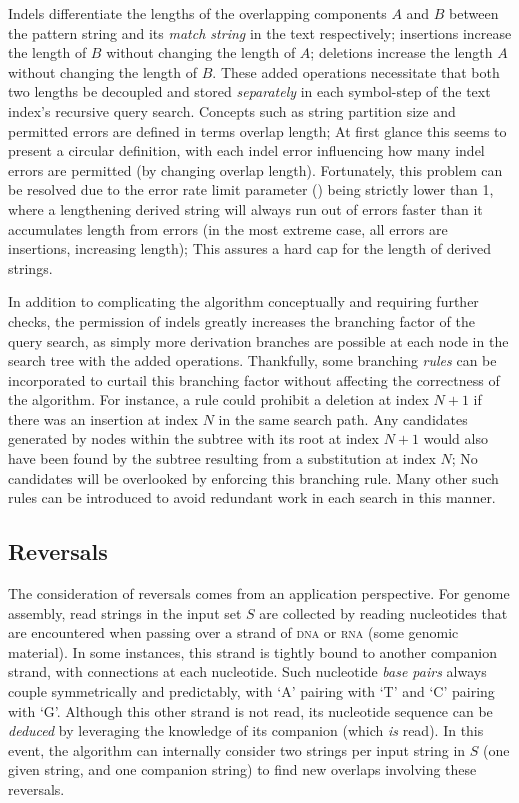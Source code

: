 Indels differentiate the lengths of the overlapping components $A$ and $B$ between the \gls{pattern} string and its \textit{match string} in the \gls{text} respectively; \Glspl{insertion} increase the length of $B$ without changing the length of $A$; \Glspl{deletion} increase the length $A$ without changing the length of $B$. These added operations necessitate that both two lengths be decoupled and stored \textit{separately} in each symbol-step of the \gls{text index}'s recursive \gls{query} search. Concepts such as \gls{string partition} size and permitted errors are defined in terms overlap length; At first glance this seems to present a circular definition, with each indel error influencing how many indel errors are permitted (by changing overlap length). Fortunately, this problem can be resolved due to the \gls{error rate} limit parameter () being strictly lower than 1, where a lengthening \gls{derived string} will always run out of errors faster than it accumulates length from errors (in the most extreme case, all errors are insertions, increasing length); This assures a hard cap for the length of derived strings.
 
In addition to complicating the algorithm conceptually and requiring further checks, the permission of indels greatly increases the branching factor of the query search, as simply more derivation branches are possible at each node in the search tree with the added operations. Thankfully, some branching \textit{rules} can be incorporated to curtail this branching factor without affecting the correctness of the algorithm. For instance, a rule could prohibit a deletion at index $N+1$ if there was an insertion at index $N$ in the same search path. Any \glspl{candidate} generated by nodes within the subtree with its root at index $N+1$ would also have been found by the subtree resulting from a \gls{substitution} at index $N$; No candidates will be overlooked by enforcing this branching rule. Many other such rules can be introduced to avoid redundant work in each search in this manner.


\subsection{Reversals}
\label{reversals}

The consideration of \glspl{reversal} comes from an application perspective. For genome assembly, \gls{read} strings in the input set $S$ are collected by reading nucleotides that are encountered when passing over a strand of \textsc{dna} or \textsc{rna} (some genomic material). In some instances, this strand is tightly bound to another companion strand, with connections at each nucleotide. Such nucleotide \textit{base pairs} always couple symmetrically and predictably, with `A' pairing with `T' and `C' pairing with `G'. Although this other strand is not read, its nucleotide sequence can be \textit{deduced} by leveraging the knowledge of its companion (which \textit{is} read). In this event, the algorithm can internally consider two strings per input string in $S$ (one given string, and one companion string) to find new overlaps involving these reversals.
 
